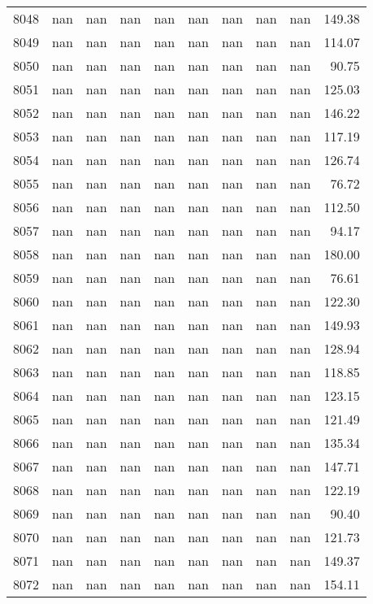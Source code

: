 \begin{tabular}{lrrrrrrrrr}
8048 & nan & nan & nan & nan & nan & nan & nan & nan & 149.38 \\
8049 & nan & nan & nan & nan & nan & nan & nan & nan & 114.07 \\
8050 & nan & nan & nan & nan & nan & nan & nan & nan & 90.75 \\
8051 & nan & nan & nan & nan & nan & nan & nan & nan & 125.03 \\
8052 & nan & nan & nan & nan & nan & nan & nan & nan & 146.22 \\
8053 & nan & nan & nan & nan & nan & nan & nan & nan & 117.19 \\
8054 & nan & nan & nan & nan & nan & nan & nan & nan & 126.74 \\
8055 & nan & nan & nan & nan & nan & nan & nan & nan & 76.72 \\
8056 & nan & nan & nan & nan & nan & nan & nan & nan & 112.50 \\
8057 & nan & nan & nan & nan & nan & nan & nan & nan & 94.17 \\
8058 & nan & nan & nan & nan & nan & nan & nan & nan & 180.00 \\
8059 & nan & nan & nan & nan & nan & nan & nan & nan & 76.61 \\
8060 & nan & nan & nan & nan & nan & nan & nan & nan & 122.30 \\
8061 & nan & nan & nan & nan & nan & nan & nan & nan & 149.93 \\
8062 & nan & nan & nan & nan & nan & nan & nan & nan & 128.94 \\
8063 & nan & nan & nan & nan & nan & nan & nan & nan & 118.85 \\
8064 & nan & nan & nan & nan & nan & nan & nan & nan & 123.15 \\
8065 & nan & nan & nan & nan & nan & nan & nan & nan & 121.49 \\
8066 & nan & nan & nan & nan & nan & nan & nan & nan & 135.34 \\
8067 & nan & nan & nan & nan & nan & nan & nan & nan & 147.71 \\
8068 & nan & nan & nan & nan & nan & nan & nan & nan & 122.19 \\
8069 & nan & nan & nan & nan & nan & nan & nan & nan & 90.40 \\
8070 & nan & nan & nan & nan & nan & nan & nan & nan & 121.73 \\
8071 & nan & nan & nan & nan & nan & nan & nan & nan & 149.37 \\
8072 & nan & nan & nan & nan & nan & nan & nan & nan & 154.11 \\

\end{tabular}
